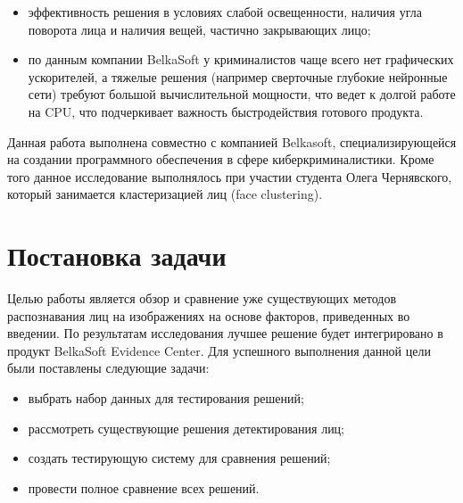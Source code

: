 \documentclass[14pt]{matmex-diploma-custom}
\begin{document}
     \begin{itemize}
         \item эффективность решения в условиях слабой освещенности, наличия угла поворота лица и наличия вещей, частично закрывающих лицо; 
         \item по данным компании BelkaSoft у криминалистов чаще всего нет графических ускорителей, а тяжелые решения (например сверточные глубокие нейронные сети) требуют большой вычислительной мощности, что ведет к долгой работе на CPU, что подчеркивает важность быстродействия готового продукта.
     \end{itemize}
   
   Данная работа выполнена совместно с компанией Belkasoft, специализирующейся на создании программного обеспечения в сфере киберкриминалистики. Кроме того данное исследование выполнялось при участии студента Олега Чернявского, который занимается кластеризацией лиц (face clustering).
   
\section{Постановка задачи}

    Целью работы является обзор и сравнение уже существующих методов распознавания лиц на изображениях на основе факторов, приведенных во введении.
    По результатам исследования лучшее решение будет интегрировано в продукт BelkaSoft Evidence Center. Для успешного выполнения данной цели были поставлены следующие задачи:
    \begin{itemize}
        \item выбрать набор данных для тестирования решений; 
        \item рассмотреть существующие решения детектирования лиц; 
        \item создать тестирующую систему для сравнения решений;
        \item провести полное сравнение всех решений.
    \end{itemize}
    
\end{document}
